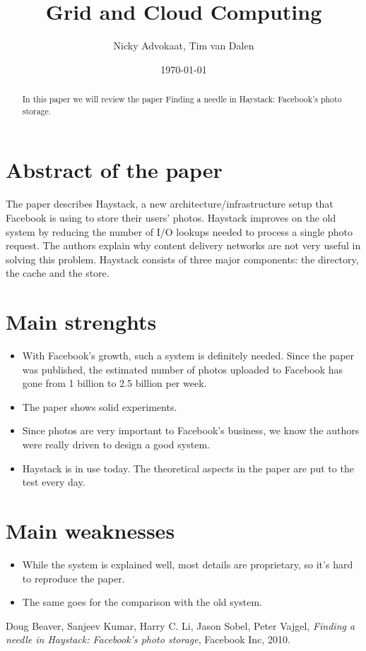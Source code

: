 \documentclass[a4paper]{article}
\title{Grid and Cloud Computing \\ \paper}
\author{Nicky Advokaat, Tim van Dalen}
\date{\today}
\newcommand{\paper}{Finding a needle in Haystack: Facebook's photo storage}
\begin{document}
\maketitle

\begin{abstract}
In this paper we will review the paper \paper \cite{thepaper}.  
\end{abstract}

\section{Abstract of the paper}
	The paper describes Haystack, a new architecture/infrastructure setup that Facebook is using to store their users' photos.
	Haystack improves on the old system by reducing the number of I/O lookups needed to process a single photo request.
	The authors explain why content delivery networks are not very useful in solving this problem.
	Haystack consists of three major components: the directory, the cache and the store.

\section{Main strenghts}
  \begin{itemize}
	  \item With Facebook's growth, such a system is definitely needed. Since the paper was published, the estimated number of photos uploaded to Facebook has gone from 1 billion to 2.5 billion per week.
	  \item The paper shows solid experiments.
    \item Since photos are very important to Facebook's business, we know the authors were really driven to design a good system.
	  \item Haystack is in use today. The theoretical aspects in the paper are put to the test every day.
  \end{itemize}

\section{Main weaknesses}
	\begin{itemize}
	  \item While the system is explained well, most details are proprietary, so it's hard to reproduce the paper.
	  \item The same goes for the comparison with the old system.
	\end{itemize}

\begin{thebibliography}{9}

  Doug Beaver, Sanjeev Kumar, Harry C. Li, Jason Sobel, Peter Vajgel,
  \emph{\paper},
  Facebook Inc, 2010.

 
\end{thebibliography}
\end{document}
